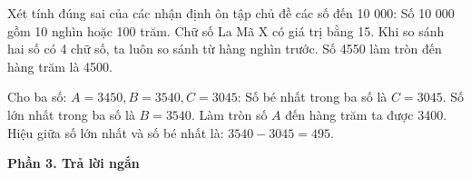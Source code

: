 \begin{ex} %
Xét tính đúng sai của các nhận định ôn tập chủ đề các số đến 10 000:
\choiceTF
{\True Số 10 000 gồm 10 nghìn hoặc 100 trăm.}
{Chữ số La Mã $\text{X}$ có giá trị bằng 15.}
{\True Khi so sánh hai số có 4 chữ số, ta luôn so sánh từ hàng nghìn trước.}
{Số 4550 làm tròn đến hàng trăm là 4500.}
\end{ex}

\begin{ex} %
Cho ba số: $A = 3450, B = 3540, C = 3045$:
\choiceTF
{\True Số bé nhất trong ba số là $C = 3045$.}
{\True Số lớn nhất trong ba số là $B = 3540$.}
{Làm tròn số $A$ đến hàng trăm ta được 3400.}
{\True Hiệu giữa số lớn nhất và số bé nhất là: $3540 - 3045 = 495$.}
\end{ex}

\textbf{Phần 3. Trả lời ngắn}

